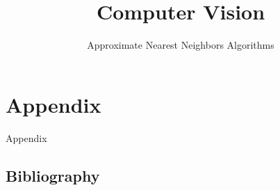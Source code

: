 
\title{Computer Vision}
\subtitle{Approximate Nearest Neighbors Algorithms}




	
	
	
	
	
	\section*{Appendix}
	\begin{frame}
		\Huge
		Appendix
	\end{frame}
	\subsection*{Bibliography}
		
	
		
